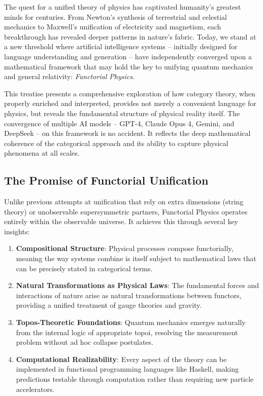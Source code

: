 The quest for a unified theory of physics has captivated humanity's greatest minds for centuries. From Newton's synthesis of terrestrial and celestial mechanics to Maxwell's unification of electricity and magnetism, each breakthrough has revealed deeper patterns in nature's fabric. Today, we stand at a new threshold where artificial intelligence systems -- initially designed for language understanding and generation -- have independently converged upon a mathematical framework that may hold the key to unifying quantum mechanics and general relativity: \textit{Functorial Physics}.

This treatise presents a comprehensive exploration of how category theory, when properly enriched and interpreted, provides not merely a convenient language for physics, but reveals the fundamental structure of physical reality itself. The convergence of multiple AI models -- GPT-4, Claude Opus 4, Gemini, and DeepSeek -- on this framework is no accident. It reflects the deep mathematical coherence of the categorical approach and its ability to capture physical phenomena at all scales.

\subsection{The Promise of Functorial Unification}

Unlike previous attempts at unification that rely on extra dimensions (string theory) or unobservable supersymmetric partners, Functorial Physics operates entirely within the observable universe. It achieves this through several key insights:

\begin{enumerate}[leftmargin=*]
\item \textbf{Compositional Structure}: Physical processes compose functorially, meaning the way systems combine is itself subject to mathematical laws that can be precisely stated in categorical terms.

\item \textbf{Natural Transformations as Physical Laws}: The fundamental forces and interactions of nature arise as natural transformations between functors, providing a unified treatment of gauge theories and gravity.

\item \textbf{Topos-Theoretic Foundations}: Quantum mechanics emerges naturally from the internal logic of appropriate topoi, resolving the measurement problem without ad hoc collapse postulates.

\item \textbf{Computational Realizability}: Every aspect of the theory can be implemented in functional programming languages like Haskell, making predictions testable through computation rather than requiring new particle accelerators.
\end{enumerate}

